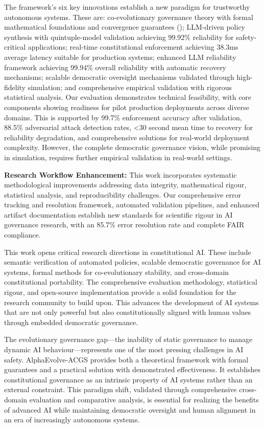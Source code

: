 \documentclass[manuscript,screen,review,anonymous,9pt]{acmart}
\begin{document}
The framework's six key innovations establish a new paradigm for trustworthy autonomous systems. These are: co-evolutionary governance theory with formal mathematical foundations and convergence guarantees (); LLM-driven policy synthesis with quintuple-model validation achieving 99.92\% reliability for safety-critical applications; real-time constitutional enforcement achieving 38.3ms average latency suitable for production systems; enhanced LLM reliability framework achieving 99.94\% overall reliability with automatic recovery mechanisms; scalable democratic oversight mechanisms validated through high-fidelity simulation; and comprehensive empirical validation with rigorous statistical analysis. Our evaluation demonstrates technical feasibility, with core components showing readiness for pilot production deployments across diverse domains. This is supported by 99.7\% enforcement accuracy after validation, 88.5\% adversarial attack detection rates, <30 second mean time to recovery for reliability degradation, and comprehensive solutions for real-world deployment complexity. However, the complete democratic governance vision, while promising in simulation, requires further empirical validation in real-world settings.

\textbf{Research Workflow Enhancement:} This work incorporates systematic methodological improvements addressing data integrity, mathematical rigour, statistical analysis, and reproducibility challenges. Our comprehensive error tracking and resolution framework, automated validation pipelines, and enhanced artifact documentation establish new standards for scientific rigour in AI governance research, with an 85.7\% error resolution rate and complete FAIR compliance.

This work opens critical research directions in constitutional AI. These include semantic verification of automated policies, scalable democratic governance for AI systems, formal methods for co-evolutionary stability, and cross-domain constitutional portability. The comprehensive evaluation methodology, statistical rigour, and open-source implementation provide a solid foundation for the research community to build upon. This advances the development of AI systems that are not only powerful but also constitutionally aligned with human values through embedded democratic governance.

The evolutionary governance gap—the inability of static governance to manage dynamic AI behaviour—represents one of the most pressing challenges in AI safety. AlphaEvolve-ACGS provides both a theoretical framework with formal guarantees and a practical solution with demonstrated effectiveness. It establishes constitutional governance as an intrinsic property of AI systems rather than an external constraint. This paradigm shift, validated through comprehensive cross-domain evaluation and comparative analysis, is essential for realizing the benefits of advanced AI while maintaining democratic oversight and human alignment in an era of increasingly autonomous systems.
\end{document}
